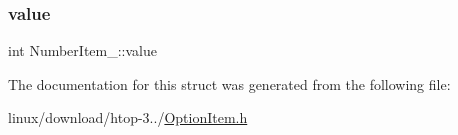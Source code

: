 \mbox{\label{structNumberItem___ab32be4b8d568becf0945f399d37e30f7}} 
\subsubsection{\texorpdfstring{value}{value}}
{\footnotesize\ttfamily int Number\+Item\+\_\+\+::value}



The documentation for this struct was generated from the following file\+:\begin{DoxyCompactItemize}
\item 
linux/download/htop-\/3../\hyperlink{OptionItem_8h}{Option\+Item.\+h}\end{DoxyCompactItemize}
